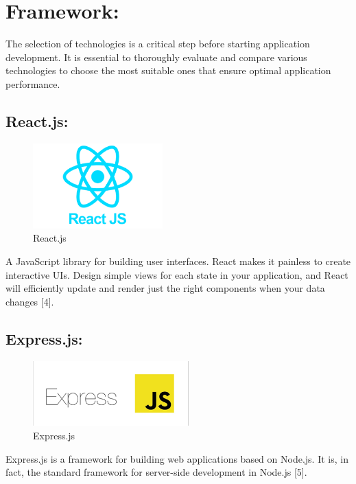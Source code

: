 \section{Framework:}

The selection of technologies is a critical step before starting application development. It is essential to thoroughly evaluate and compare various technologies to choose the most suitable ones that ensure optimal application performance.

\subsection{React.js:}

\begin{figure}[!h]
\begin{center}
\includegraphics[width=5cm]{images/Reactjs.png}
\end{center}
\caption{React.js}
\end{figure}

A JavaScript library for building user interfaces. React makes it painless to create interactive UIs. Design simple views for each state in your application, and React will efficiently update and render just the right components when your data changes [4].

\subsection{Express.js:}

\begin{figure}[!h]
\begin{center}
\includegraphics[width=6cm]{images/Expressjs.png}
\end{center}
\caption{Express.js}
\end{figure}

Express.js is a framework for building web applications based on Node.js. It is, in fact, the standard framework for server-side development in Node.js [5].

